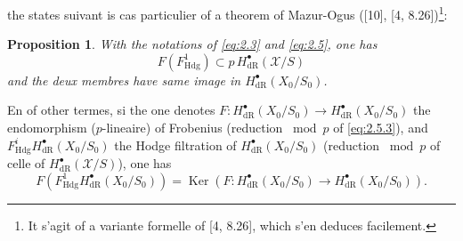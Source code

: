 \documentclass[12pt,a4paper]{article}
\theoremstyle{plain}
\newtheorem{proposition}[theorem]{Proposition}
\theoremstyle{definition}
\theoremstyle{remark}
\DeclareMathOperator{\Ker}{Ker}
\newcommand{\Hdg}{\mathrm{Hdg}}
\begin{document}
\medskip
the states suivant is cas particulier of a theorem of Mazur-Ogus ([10], [4, 8.26])\footnote{It s'agit of a variante formelle of [4, 8.26], which s'en deduces facilement.}:

\begin{proposition}\label{prop:2.6}
With the notations of \eqref{eq:2.3} and \eqref{eq:2.5}, one has
\[
F(F^1_{\Hdg}) \subset p\, H^{\bullet}_{\mathrm{dR}}(\mathcal{X}/S)
\]
and the deux membres have same image in $H^{\bullet}_{\mathrm{dR}}(X_0/S_0)$.
\end{proposition}

En of other termes, si the one denotes $F: H^{\bullet}_{\mathrm{dR}}(X_0/S_0) \to H^{\bullet}_{\mathrm{dR}}(X_0/S_0)$ the endomorphism ($p$-lineaire) of Frobenius (reduction $\bmod p$ of \eqref{eq:2.5.3}), and $F^i_{\Hdg} H^{\bullet}_{\mathrm{dR}}(X_0/S_0)$ the Hodge filtration of $H^{\bullet}_{\mathrm{dR}}(X_0/S_0)$ (reduction $\bmod p$ of celle of $H^{\bullet}_{\mathrm{dR}}(\mathcal{X}/S)$), one has
\begin{equation}\label{eq:2.6.1}
F(F^1_{\Hdg} H^{\bullet}_{\mathrm{dR}}(X_0/S_0)) = \Ker(F: H^{\bullet}_{\mathrm{dR}}(X_0/S_0) \to H^{\bullet}_{\mathrm{dR}}(X_0/S_0)).
\end{equation}
\end{document}
